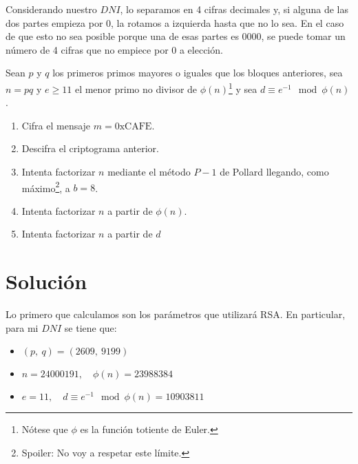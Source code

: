 	Considerando nuestro $DNI$, lo separamos en 4 cifras decimales y, si alguna de las dos partes empieza por 0,
	la rotamos a izquierda hasta que no lo sea. En el caso de que esto no sea posible porque una de esas partes
	es 0000, se puede tomar un número de 4 cifras que no empiece por 0 a elección.
	
	Sean $p$ y $q$ los primeros primos mayores o iguales que los bloques anteriores, sea $n = pq$ y $e \geq 11$
	el menor primo no divisor de $\phi(n)$\footnote{Nótese que $\phi$ es la función totiente de Euler.} y sea
	$d \equiv e^{-1} \mod \phi(n)$.
	\begin{enumerate}
		\item Cifra el mensaje $m = \mathrm{0xCAFE}$.
		\item Descifra el criptograma anterior.
		\item Intenta factorizar $n$ mediante el método $P-1$ de Pollard llegando, como máximo\footnote{Spoiler:
		No voy a respetar este límite.}, a $b = 8$.
		\item Intenta factorizar $n$ a partir de $\phi(n)$.
		\item Intenta factorizar $n$ a partir de $d$
	\end{enumerate}
\section*{Solución}
	Lo primero que calculamos son los parámetros que utilizará RSA. En particular, para mi $DNI$ se tiene que:
	\begin{itemize}
		\item $(p,\ q) = (2609,\ 9199)$
		\item $n = 24000191, \quad \phi(n) = 23988384$
		\item $e = 11, \quad d \equiv e^{-1} \mod \phi(n) = 10903811$
	\end{itemize}

